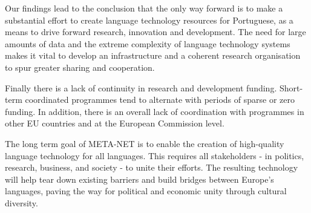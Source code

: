 \documentclass[]{../metanetpaper}
\begin{document}
\begin{multicols}{2}
Our findings lead to the conclusion that the only way forward is to make a substantial effort to create language technology resources for Portuguese, as a means to drive forward research, innovation and development. The need for large amounts of data and the extreme complexity of language technology systems makes it vital to develop an infrastructure and a coherent research organisation to spur greater sharing and cooperation.

Finally there is a lack of continuity in research and development funding. Short-term coordinated programmes tend to alternate with periods of sparse or zero funding. In addition, there is an overall lack of coordination with programmes in other EU countries and at the European Commission level.

The long term goal of META-NET is to enable the creation of high-quality language technology for all languages. This requires all stakeholders - in politics, research, business, and society - to unite their efforts. The resulting technology will help tear down existing barriers and build bridges between Europe’s languages, paving the way for political and economic unity through cultural diversity. 
\end{multicols}

\clearpage

\end{document}

